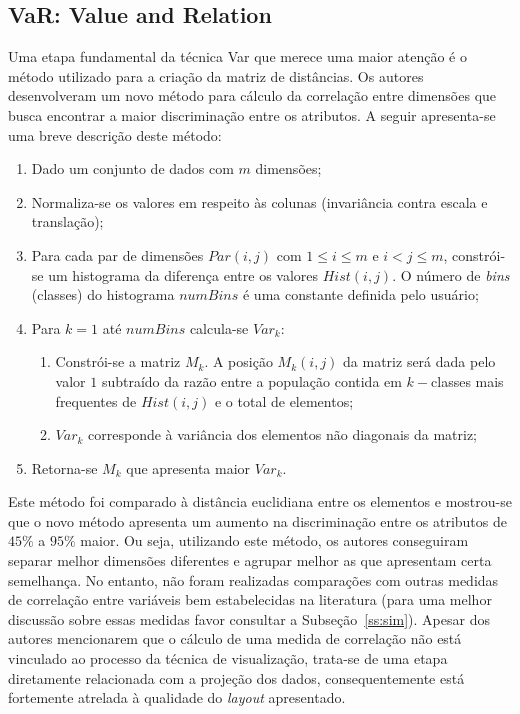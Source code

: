 

\subsection{VaR: Value and Relation}\label{sec:var}

Uma etapa fundamental da técnica Var que merece uma maior atenção é o método utilizado para a criação da matriz de distâncias. Os autores desenvolveram um novo método para cálculo da correlação entre dimensões que busca encontrar a maior discriminação entre os atributos. A seguir apresenta-se uma breve  descrição deste método:

\begin{enumerate}
   
    \item Dado um conjunto de dados com $m$ dimensões; 
    \item Normaliza-se os valores em respeito às colunas (invariância contra escala e translação);
    \item Para cada par de dimensões $Par(i,j)$ com $1 \leq i \leq m$ e $i < j \leq m$, constrói-se um histograma da diferença entre os valores $Hist(i,j)$. O número de \emph{bins} (classes) do histograma $numBins$ é uma constante definida pelo usuário;
    \item Para $k = 1$ até $numBins$ calcula-se $Var_k$:
    \begin{enumerate}
        \item Constrói-se a matriz $M_k$. A posição $M_k(i,j)$ da matriz será dada pelo valor $1$ subtraído da razão entre a população contida em $k-$classes mais frequentes de $Hist(i,j)$ e o total de elementos;
        \item $Var_k$ corresponde à variância dos elementos não diagonais da matriz;
    \end{enumerate}
\item Retorna-se $M_k$ que apresenta maior $Var_k$.

\end{enumerate}

Este método foi comparado à distância euclidiana entre os elementos e mostrou-se que o novo método apresenta um aumento na discriminação entre os atributos de $45\%$ a $95\%$ maior. Ou seja, utilizando este método, os autores conseguiram separar melhor dimensões diferentes e agrupar melhor as que apresentam certa semelhança. No entanto, não foram realizadas comparações com outras medidas de correlação entre variáveis bem estabelecidas na  literatura (para uma melhor discussão sobre essas medidas favor consultar a Subseção~\ref{ss:sim}). Apesar dos autores mencionarem que o cálculo de uma medida de correlação não está vinculado ao processo da técnica de visualização, trata-se de uma etapa diretamente relacionada com a projeção dos dados, consequentemente está fortemente atrelada à qualidade do \emph{layout} apresentado.

